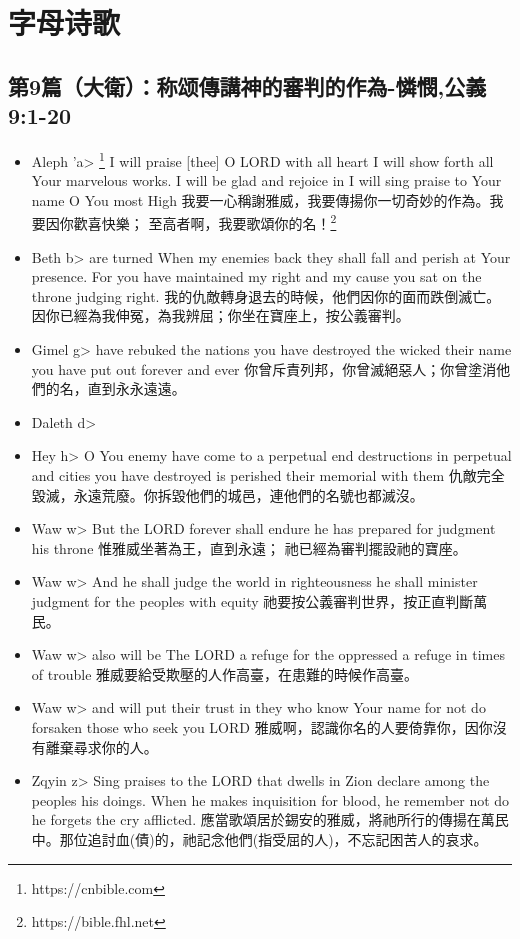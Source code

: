 \section{字母诗歌}
\subsection{第9篇（大衛）：称颂傳講神的審判的作為-憐憫,公義  9:1-20}
\begin{itemize}
\itemsep-.45em  
\item Aleph \<'a> \footnote{https://cnbible.com} I will praise [thee] O LORD with all heart I will show forth all Your marvelous works. I will be glad and rejoice in I will sing praise to Your name O You most High 我要一心稱謝雅威，我要傳揚你一切奇妙的作為。我要因你歡喜快樂； 至高者啊，我要歌頌你的名！\footnote{https://bible.fhl.net}
\item Beth \<b> are turned When my enemies back they shall fall and perish at Your presence. For you have maintained my right and my cause you sat on the throne judging right. 我的仇敵轉身退去的時候，他們因你的面而跌倒滅亡。因你已經為我伸冤，為我辨屈；你坐在寶座上，按公義審判。
\item Gimel \<g> have rebuked the nations you have destroyed the wicked their name you have put out forever and ever 你曾斥責列邦，你曾滅絕惡人；你曾塗消他們的名，直到永永遠遠。  
\item Daleth \<d> \\
\item Hey \<h> O You enemy have come to a perpetual end destructions in perpetual and cities you have destroyed is perished their memorial with them  仇敵完全毀滅，永遠荒廢。你拆毀他們的城邑，連他們的名號也都滅沒。
\item Waw \<w> But the LORD forever shall endure he has prepared for judgment his throne 惟雅威坐著為王，直到永遠； 祂已經為審判擺設祂的寶座。
\item Waw \<w> And he shall judge the world in righteousness he shall minister judgment for the peoples with equity 祂要按公義審判世界，按正直判斷萬民。
\item Waw \<w> also will be The LORD a refuge for the oppressed a refuge in times of trouble  雅威要給受欺壓的人作高臺，在患難的時候作高臺。
\item Waw \<w> and will put their trust in they who know Your name for not do forsaken those who seek you LORD 雅威啊，認識你名的人要倚靠你，因你沒有離棄尋求你的人。
\item Zqyin  \<z> Sing praises to the LORD that dwells in Zion declare among the peoples his doings. When he makes inquisition for blood, he remember not do he forgets the cry afflicted. 應當歌頌居於錫安的雅威，將祂所行的傳揚在萬民中。那位追討血(債)的，祂記念他們(指受屈的人)，不忘記困苦人的哀求。

\end{itemize}
